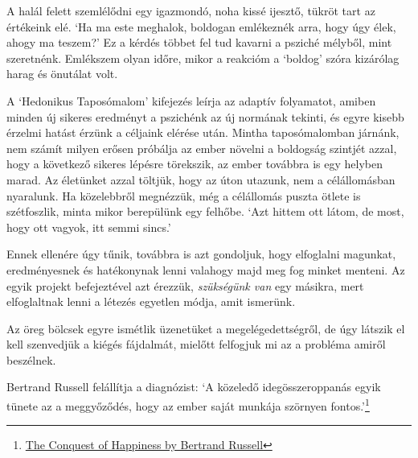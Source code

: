 
\enlargethispage*{\baselineskip}

A halál felett szemlélődni egy igazmondó, noha kissé ijesztő, tükröt
tart az értékeink elé. `Ha ma este meghalok, boldogan emlékeznék arra,
hogy úgy élek, ahogy ma teszem?' Ez a kérdés többet fel tud kavarni a
psziché mélyből, mint szeretnénk. Emlékszem olyan időre, mikor a
reakcióm a `boldog' szóra kizárólag harag és önutálat volt.

A `Hedonikus Taposómalom' kifejezés leírja az adaptív folyamatot, amiben
minden új sikeres eredményt a pszichénk az új normának tekinti, és egyre
kisebb érzelmi hatást érzünk a céljaink elérése után. Mintha
taposómalomban járnánk, nem számít milyen erősen próbálja az ember
növelni a boldogság szintjét azzal, hogy a következő sikeres lépésre
törekszik, az ember továbbra is egy helyben marad. Az életünket azzal
töltjük, hogy az úton utazunk, nem a célállomásban nyaralunk. Ha
közelebbről megnézzük, még a célállomás puszta ötlete is szétfoszlik,
minta mikor berepülünk egy felhőbe. `Azt hittem ott látom, de most, hogy
ott vagyok, itt semmi sincs.'

Ennek ellenére úgy tűnik, továbbra is azt gondoljuk, hogy elfoglalni
magunkat, eredményesnek és hatékonynak lenni valahogy majd meg fog
minket menteni. Az egyik projekt befejeztével azt érezzük,
\emph{szükségünk van} egy másikra, mert elfoglaltnak lenni a létezés
egyetlen módja, amit ismerünk.

Az öreg bölcsek egyre ismétlik üzenetüket a megelégedettségről, de úgy
látszik el kell szenvedjük a kiégés fájdalmát, mielőtt felfogjuk mi az a
probléma amiről beszélnek.

Bertrand Russell felállítja a diagnózist: `A közeledő idegösszeroppanás
egyik tünete az a meggyőződés, hogy az ember saját munkája szörnyen
fontos.'\footnote{\href{https://www.goodreads.com/book/show/51783.The_Conquest_of_Happiness}{The
  Conquest of Happiness by Bertrand Russell}}

\clearpage
\figurepagelayout

